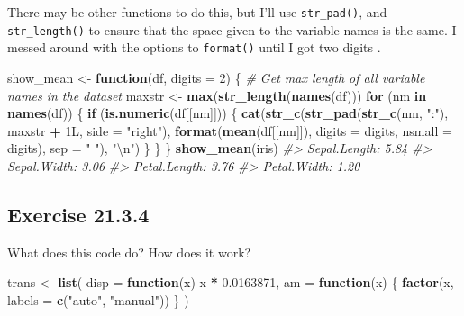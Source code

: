 \documentclass[]{book}
\newenvironment{Shaded}{\begin{snugshade}}{\end{snugshade}}
\newcommand{\CharTok}[1]{\textcolor[rgb]{0.31,0.60,0.02}{#1}}
\newcommand{\CommentTok}[1]{\textcolor[rgb]{0.56,0.35,0.01}{\textit{#1}}}
\newcommand{\ControlFlowTok}[1]{\textcolor[rgb]{0.13,0.29,0.53}{\textbf{#1}}}
\newcommand{\DataTypeTok}[1]{\textcolor[rgb]{0.13,0.29,0.53}{#1}}
\newcommand{\DecValTok}[1]{\textcolor[rgb]{0.00,0.00,0.81}{#1}}
\newcommand{\FloatTok}[1]{\textcolor[rgb]{0.00,0.00,0.81}{#1}}
\newcommand{\KeywordTok}[1]{\textcolor[rgb]{0.13,0.29,0.53}{\textbf{#1}}}
\newcommand{\NormalTok}[1]{#1}
\newcommand{\OperatorTok}[1]{\textcolor[rgb]{0.81,0.36,0.00}{\textbf{#1}}}
\newcommand{\StringTok}[1]{\textcolor[rgb]{0.31,0.60,0.02}{#1}}
\theoremstyle{plain}
\theoremstyle{remark}
\begin{document}
There may be other functions to do this, but I'll use
\texttt{str\_pad()}, and \texttt{str\_length()} to ensure that the space
given to the variable names is the same. I messed around with the
options to \texttt{format()} until I got two digits .

\begin{Shaded}
\begin{Highlighting}[]
\NormalTok{show_mean <-}\StringTok{ }\ControlFlowTok{function}\NormalTok{(df, }\DataTypeTok{digits =} \DecValTok{2}\NormalTok{) \{}
  \CommentTok{# Get max length of all variable names in the dataset}
\NormalTok{  maxstr <-}\StringTok{ }\KeywordTok{max}\NormalTok{(}\KeywordTok{str_length}\NormalTok{(}\KeywordTok{names}\NormalTok{(df)))}
  \ControlFlowTok{for}\NormalTok{ (nm }\ControlFlowTok{in} \KeywordTok{names}\NormalTok{(df)) \{}
    \ControlFlowTok{if}\NormalTok{ (}\KeywordTok{is.numeric}\NormalTok{(df[[nm]])) \{}
      \KeywordTok{cat}\NormalTok{(}\KeywordTok{str_c}\NormalTok{(}\KeywordTok{str_pad}\NormalTok{(}\KeywordTok{str_c}\NormalTok{(nm, }\StringTok{":"}\NormalTok{), maxstr }\OperatorTok{+}\StringTok{ }\NormalTok{1L, }\DataTypeTok{side =} \StringTok{"right"}\NormalTok{),}
                \KeywordTok{format}\NormalTok{(}\KeywordTok{mean}\NormalTok{(df[[nm]]), }\DataTypeTok{digits =}\NormalTok{ digits, }\DataTypeTok{nsmall =}\NormalTok{ digits),}
                \DataTypeTok{sep =} \StringTok{" "}\NormalTok{),}
          \StringTok{"}\CharTok{\textbackslash{}n}\StringTok{"}\NormalTok{)}
\NormalTok{    \}}
\NormalTok{  \}}
\NormalTok{\}}
\KeywordTok{show_mean}\NormalTok{(iris)}
\CommentTok{#> Sepal.Length: 5.84 }
\CommentTok{#> Sepal.Width:  3.06 }
\CommentTok{#> Petal.Length: 3.76 }
\CommentTok{#> Petal.Width:  1.20}
\end{Highlighting}
\end{Shaded}

\hypertarget{exercise-21.3.4}{%
\subsection*{\texorpdfstring{Exercise
{21.3.4}}{Exercise 21.3.4}}\label{exercise-21.3.4}}

What does this code do? How does it work?

\begin{Shaded}
\begin{Highlighting}[]
\NormalTok{trans <-}\StringTok{ }\KeywordTok{list}\NormalTok{(}
  \DataTypeTok{disp =} \ControlFlowTok{function}\NormalTok{(x) x }\OperatorTok{*}\StringTok{ }\FloatTok{0.0163871}\NormalTok{,}
  \DataTypeTok{am =} \ControlFlowTok{function}\NormalTok{(x) \{}
    \KeywordTok{factor}\NormalTok{(x, }\DataTypeTok{labels =} \KeywordTok{c}\NormalTok{(}\StringTok{"auto"}\NormalTok{, }\StringTok{"manual"}\NormalTok{))}
\NormalTok{  \}}
\NormalTok{)}
\end{Highlighting}
\end{Shaded}
\end{document}
